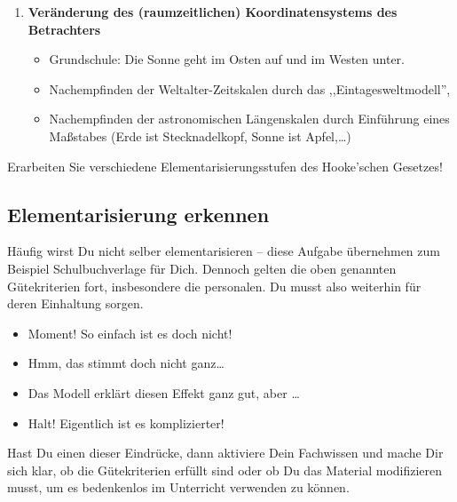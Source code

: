 \begin{enumerate}
	\item \textbf{Ver\"{a}nderung des (raumzeitlichen) Koordinatensystems des
	Betrachters}
	\begin{beisp2}
	\begin{itemize}
		\item Grundschule: Die Sonne geht im Osten auf und im Westen unter.
		\item Nachempfinden der Weltalter-Zeitskalen durch das ,,Eintagesweltmodell'',
		\item Nachempfinden der astronomischen L\"{a}ngenskalen durch Einf\"{u}hrung eines
		Ma{\ss}stabes (Erde ist Stecknadelkopf, Sonne ist Apfel,\dots)
	\end{itemize}
	\end{beisp2}
	
\end{enumerate}

\begin{uea}
	Erarbeiten Sie verschiedene Elementarisierungsstufen des Hooke'schen Gesetzes!
\end{uea}

\subsection{Elementarisierung erkennen}
Häufig wirst Du nicht selber elementarisieren -- diese Aufgabe übernehmen zum Beispiel Schulbuchverlage für Dich. Dennoch gelten die oben genannten Gütekriterien fort, insbesondere die personalen. Du musst also weiterhin für deren Einhaltung sorgen. \begin{itemize}
	\item Moment! So einfach ist es doch nicht!
	\item Hmm, das stimmt doch nicht ganz\dots
	\item Das Modell erklärt diesen Effekt ganz gut, aber \dots
	\item Halt! Eigentlich ist es komplizierter!
\end{itemize}
Hast Du einen dieser Eindrücke, dann aktiviere Dein Fachwissen und mache Dir sich klar, ob die Gütekriterien erfüllt sind oder ob Du das Material modifizieren musst, um es bedenkenlos im Unterricht verwenden zu können.

